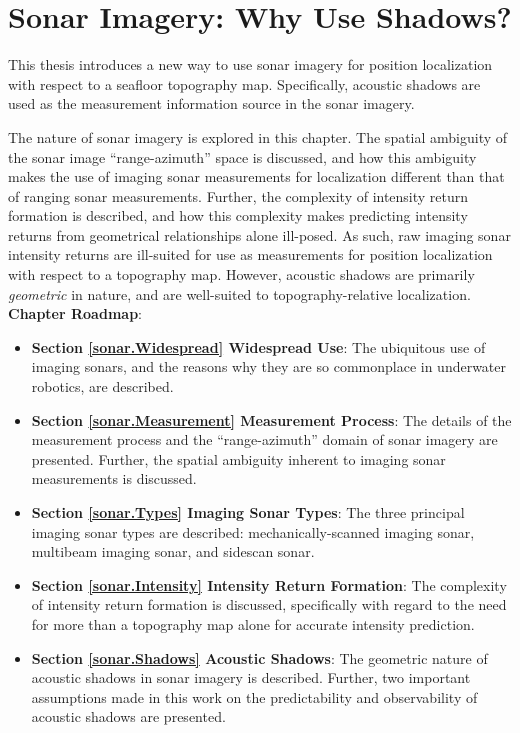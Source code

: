 
\chapter{Sonar Imagery: Why Use Shadows?}
\label{ch.SonarImagery}

This thesis introduces a new way to use sonar imagery for position localization with respect to a seafloor topography map.
Specifically, acoustic shadows are used as the measurement information source in the sonar imagery.

The nature of sonar imagery is explored in this chapter.  
The spatial ambiguity of the sonar image ``range-azimuth'' space is discussed, and how this ambiguity makes the use of imaging sonar measurements for localization different than that of ranging sonar measurements.
Further, the complexity of intensity return formation is described, and how this complexity makes predicting intensity returns from geometrical relationships alone ill-posed.
As such, raw imaging sonar intensity returns are ill-suited for use as measurements for position localization with respect to a topography map.
However, acoustic shadows are primarily \emph{geometric} in nature, and are well-suited to topography-relative localization.
\\

\noindent \textbf{Chapter Roadmap}:  

\begin{itemize}

\item \textbf{Section \ref{sonar.Widespread} Widespread Use}:  The ubiquitous use of imaging sonars, and the reasons why they are so commonplace in underwater robotics, are described.

\item \textbf{Section \ref{sonar.Measurement} Measurement Process}: The details of the measurement process and the ``range-azimuth'' domain of sonar imagery are presented.  Further, the spatial ambiguity inherent to imaging sonar measurements is discussed.

\item \textbf{Section \ref{sonar.Types} Imaging Sonar Types}: The three principal imaging sonar types are described: mechanically-scanned imaging sonar, multibeam imaging sonar, and sidescan sonar. 

\item \textbf{Section \ref{sonar.Intensity} Intensity Return Formation}: The complexity of intensity return formation is discussed, specifically with regard to the need for more than a topography map alone for accurate intensity prediction.

\item \textbf{Section \ref{sonar.Shadows} Acoustic Shadows}: The geometric nature of acoustic shadows in sonar imagery is described. Further, two important assumptions made in this work on the predictability and observability of acoustic shadows are presented.
 
\end{itemize}

